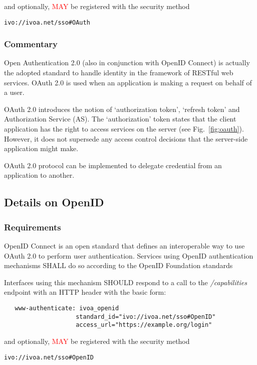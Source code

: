 \documentclass[11pt,a4paper]{ivoa}
\begin{document}
and optionally, \textcolor{red}{MAY} be registered with the security
method

\texttt{ivo://ivoa.net/sso\#OAuth}


\subsubsection{Commentary}
Open Authentication 2.0 (also in conjunction with OpenID Connect) is
actually the adopted standard
to handle identity in the framework of RESTful web services.
OAuth 2.0 is used when an application is making a request on behalf of a
user.

OAuth 2.0 introduces the notion of  `authorization token',  `refresh
token' and Authorization Service (AS).
The `authorization' token states that the client application has the
right to access services on the server  (see Fig.~\ref{fig:oauth}).
However, it does not supersede any access control decisions that the
server-side application might make.

OAuth 2.0 protocol can be implemented  to delegate credential from an
application to another.

\subsection{Details on OpenID}
\subsubsection{Requirements}
OpenID Connect is an open standard that defines an
interoperable way to use OAuth 2.0 to perform user authentication. 
Services using OpenID authentication mechanisms SHALL do so according to
the OpenID Foundation standards \citep{std:openid}

Interfaces using this mechanism SHOULD respond to a call to the 
\emph{/capabilities} endpoint with an HTTP header with the basic form:
\begin{verbatim}
   www-authenticate: ivoa_openid 
                    standard_id="ivo://ivoa.net/sso#OpenID"
                    access_url="https://example.org/login"
\end{verbatim}

and optionally, \textcolor{red}{MAY}  be registered with the security
method

\texttt{ivo://ivoa.net/sso\#OpenID}
\end{document}
